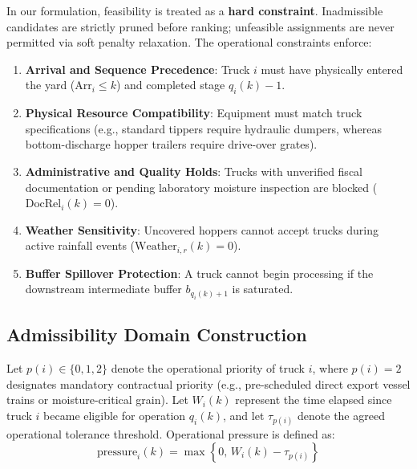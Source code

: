 \documentclass[12pt,a4paper]{article}
\begin{document}
In our formulation, feasibility is treated as a \textbf{hard constraint}. Inadmissible candidates are strictly pruned before ranking; unfeasible assignments are never permitted via soft penalty relaxation. The operational constraints enforce:
\begin{enumerate}[leftmargin=1.2cm,itemsep=0pt,topsep=2pt]
  \item \textbf{Arrival and Sequence Precedence}: Truck $i$ must have physically entered the yard ($\mathrm{Arr}_i \le k$) and completed stage $q_i(k)-1$.
  \item \textbf{Physical Resource Compatibility}: Equipment must match truck specifications (e.g., standard tippers require hydraulic dumpers, whereas bottom-discharge hopper trailers require drive-over grates).
  \item \textbf{Administrative and Quality Holds}: Trucks with unverified fiscal documentation or pending laboratory moisture inspection are blocked ($\mathrm{DocRel}_i(k) = 0$).
  \item \textbf{Weather Sensitivity}: Uncovered hoppers cannot accept trucks during active rainfall events ($\mathrm{Weather}_{i,r}(k) = 0$).
  \item \textbf{Buffer Spillover Protection}: A truck cannot begin processing if the downstream intermediate buffer $b_{q_i(k)+1}$ is saturated.
\end{enumerate}

\subsection{Admissibility Domain Construction}
Let $p(i) \in \{0, 1, 2\}$ denote the operational priority of truck $i$, where $p(i)=2$ designates mandatory contractual priority (e.g., pre-scheduled direct export vessel trains or moisture-critical grain). Let $W_i(k)$ represent the time elapsed since truck $i$ became eligible for operation $q_i(k)$, and let $\tau_{p(i)}$ denote the agreed operational tolerance threshold. Operational pressure is defined as:
\begin{equation}
  \mathrm{pressure}_i(k) = \max\left\{ 0,\, W_i(k) - \tau_{p(i)} \right\}
\end{equation}
\end{document}
